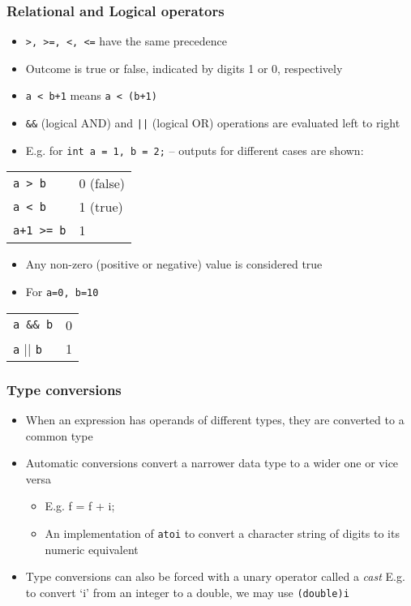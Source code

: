 \documentclass[11pt]{beamer}
\begin{document}
\begin{frame}[fragile]\frametitle{Relational and Logical operators}
\label{sec-1-15}

\begin{itemize}
\item \verb~>, >=, <, <=~ have the same precedence
\item Outcome is true or false, indicated by digits 1 or 0, respectively
\item \verb~a < b+1~ means \verb~a < (b+1)~
\item \verb~&&~ (logical AND) and \verb~||~ (logical OR) operations are evaluated left to right
\item E.g. for \verb~int a = 1, b = 2;~ -- outputs for different cases are shown:
\end{itemize}

\begin{center}
\begin{tabular}{|l|l|}
 \verb~a > b~     &  0 (false)  \\
 \verb~a < b~     &  1 (true)   \\
 \verb~a+1 >= b~  &  1          \\
\end{tabular}
\end{center}


\begin{itemize}
\item Any non-zero (positive or negative) value is considered true
\item For \verb~a=0, b=10~
\end{itemize}

\begin{center}
\begin{tabular}{|l|l|}
 \verb~a && b~                   &  0  \\
 \verb~a~ $\vert\vert$ \verb~b~  &  1  \\
\end{tabular}
\end{center}
\end{frame}
\begin{frame}[fragile]\frametitle{Type conversions}
\label{sec-1-16}

\begin{itemize}
\item When an expression has operands of different types, they are converted to a common type
\item Automatic conversions convert a narrower data type to a wider one or vice versa
\begin{itemize}
\item E.g. f = f + i;
\item An implementation of \verb~atoi~ to convert a character string of digits to its numeric equivalent
\end{itemize}
\end{itemize}
\begin{itemize}
\item Type conversions can also be forced with a unary operator called a \emph{cast}
  E.g. to convert `i' from an integer to a double, we may use \verb~(double)i~
\end{itemize}
\end{frame}
\end{document}
